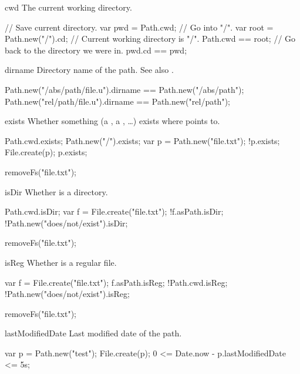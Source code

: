 \begin{urbiscriptapi}
\item[cwd]%
  The current working directory.
\begin{urbiassert}[firstnumber=1]
// Save current directory.
var pwd = Path.cwd;
// Go into "/".
var root = Path.new("/").cd;
// Current working directory is "/".
Path.cwd == root;
// Go back to the directory we were in.
pwd.cd == pwd;
\end{urbiassert}

\item[dirname]%
  Directory name of the path.  See also .
\begin{urbiassert}
Path.new("/abs/path/file.u").dirname == Path.new("/abs/path");
Path.new("rel/path/file.u").dirname  == Path.new("rel/path");
\end{urbiassert}


\item[exists]%
  Whether something (a , a , \ldots) exists
  where \this points to.
\begin{urbiassert}
Path.cwd.exists;
Path.new("/").exists;
var p = Path.new("file.txt");
!p.exists;
File.create(p);
p.exists;
\end{urbiassert}
\begin{urbicomment}
removeFs("file.txt");
\end{urbicomment}


\item[isDir]%
  Whether \this is a directory.
\begin{urbiassert}
Path.cwd.isDir;
var f = File.create("file.txt");
!f.asPath.isDir;
!Path.new("does/not/exist").isDir;
\end{urbiassert}
\begin{urbicomment}
removeFs("file.txt");
\end{urbicomment}


\item[isReg]%
  Whether \this is a regular file.
\begin{urbiassert}
var f = File.create("file.txt");
 f.asPath.isReg;
!Path.cwd.isReg;
!Path.new("does/not/exist").isReg;
\end{urbiassert}
\begin{urbicomment}
removeFs("file.txt");
\end{urbicomment}


\item[lastModifiedDate]%
  Last modified date of the path.
\begin{urbiassert}
var p = Path.new("test");
File.create(p);
0 <= Date.now - p.lastModifiedDate <= 5s;
\end{urbiassert}



\end{urbiscriptapi}
